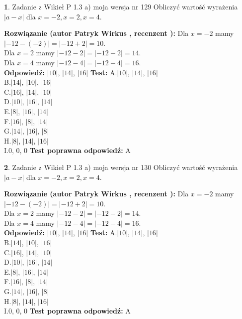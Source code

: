 \documentclass[12pt, a4paper]{article}
\theoremstyle{definition} %
\newtheorem{zad}{}
\newcommand{\zadStart}[1]{\begin{zad}#1\newline}
\newcommand{\zadStop}{\end{zad}}
\newcommand{\rozwStart}[2]{\noindent \textbf{Rozwiązanie (autor #1 , recenzent #2): }\newline}
\newcommand{\rozwStop}{\newline}
\newcommand{\odpStart}{\noindent \textbf{Odpowiedź:}\newline}
\newcommand{\odpStop}{\newline}
\newcommand{\testStart}{\noindent \textbf{Test:}\newline}
\newcommand{\testStop}{\newline}
\newcommand{\kluczStart}{\noindent \textbf{Test poprawna odpowiedź:}\newline}
\newcommand{\kluczStop}{\newline}
\begin{document}
\zadStart{Zadanie z Wikieł P 1.3 a) moja wersja nr 129}
Obliczyć wartość wyrażenia $|a - x|$ dla $x=-2,x=2,x=4$.
\zadStop
\rozwStart{Patryk Wirkus}{}
Dla $x = -2$ mamy $|-12 - (-2)| = |-12 + 2| = 10$.\\
Dla $x = 2$ mamy $|-12 - 2| = |-12 - 2| = 14$.\\
Dla $x = 4$ mamy $|-12 - 4| = |-12 - 4| = 16$.\\
\rozwStop
\odpStart
$|10|$, $|14|$, $|16|$
\odpStop
\testStart
A.$|10|$, $|14|$, $|16|$\\
B.$|14|$, $|10|$, $|16|$\\
C.$|16|$, $|14|$, $|10|$\\
D.$|10|$, $|16|$, $|14|$\\
E.$|8|$, $|16|$, $|14|$\\
F.$|16|$, $|8|$, $|14|$\\
G.$|14|$, $|16|$, $|8|$\\
H.$|8|$, $|14|$, $|16|$\\
I.$0$, $0$, $0$
\testStop
\kluczStart
A
\kluczStop



\zadStart{Zadanie z Wikieł P 1.3 a) moja wersja nr 130}
Obliczyć wartość wyrażenia $|a - x|$ dla $x=-2,x=2,x=4$.
\zadStop
\rozwStart{Patryk Wirkus}{}
Dla $x = -2$ mamy $|-12 - (-2)| = |-12 + 2| = 10$.\\
Dla $x = 2$ mamy $|-12 - 2| = |-12 - 2| = 14$.\\
Dla $x = 4$ mamy $|-12 - 4| = |-12 - 4| = 16$.\\
\rozwStop
\odpStart
$|10|$, $|14|$, $|16|$
\odpStop
\testStart
A.$|10|$, $|14|$, $|16|$\\
B.$|14|$, $|10|$, $|16|$\\
C.$|16|$, $|14|$, $|10|$\\
D.$|10|$, $|16|$, $|14|$\\
E.$|8|$, $|16|$, $|14|$\\
F.$|16|$, $|8|$, $|14|$\\
G.$|14|$, $|16|$, $|8|$\\
H.$|8|$, $|14|$, $|16|$\\
I.$0$, $0$, $0$
\testStop
\kluczStart
A
\kluczStop
\end{document}
